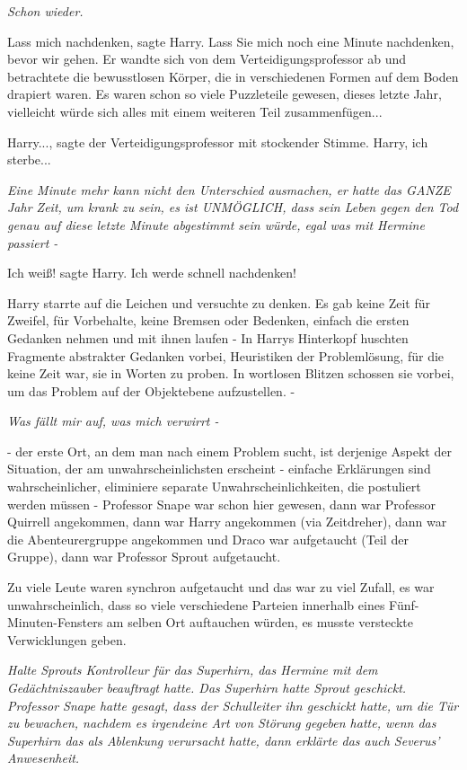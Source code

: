 \emph{Schon wieder.}

\glqq{}Lass mich nachdenken\grqq{}, sagte Harry. \glqq{}Lass Sie mich noch eine
Minute nachdenken, bevor wir gehen.\grqq{} Er wandte sich von dem
Verteidigungsprofessor ab und betrachtete die bewusstlosen Körper, die in
verschiedenen Formen auf dem Boden drapiert waren. Es waren schon so viele
Puzzleteile gewesen, dieses letzte Jahr, vielleicht würde sich alles mit einem
weiteren Teil zusammenfügen...

\glqq{}Harry...\grqq{}, sagte der Verteidigungsprofessor mit stockender Stimme.
\glqq{}Harry, ich sterbe...\grqq{}

\emph{Eine Minute mehr kann nicht den Unterschied ausmachen, er hatte das GANZE
Jahr Zeit, um krank zu sein, es ist UNMÖGLICH, dass sein Leben gegen den Tod
genau auf diese letzte Minute abgestimmt sein würde, egal was mit Hermine
passiert -}

\glqq{}Ich weiß!\grqq{} sagte Harry. \glqq{}Ich werde schnell nachdenken!\grqq{}

Harry starrte auf die Leichen und versuchte zu denken. Es gab keine Zeit für
Zweifel, für Vorbehalte, keine Bremsen oder Bedenken, einfach die ersten
Gedanken nehmen und mit ihnen laufen - In Harrys Hinterkopf huschten Fragmente
abstrakter Gedanken vorbei, Heuristiken der Problemlösung, für die keine Zeit
war, sie in Worten zu proben. In wortlosen Blitzen schossen sie vorbei, um das
Problem auf der Objektebene aufzustellen. -

\emph{Was fällt mir auf, was mich verwirrt -}

- der erste Ort, an dem man nach einem Problem sucht, ist derjenige Aspekt der
Situation, der am unwahrscheinlichsten erscheint - einfache Erklärungen sind
wahrscheinlicher, eliminiere separate Unwahrscheinlichkeiten, die postuliert
werden müssen - Professor Snape war schon hier gewesen, dann war Professor
Quirrell angekommen, dann war Harry angekommen (via Zeitdreher), dann war die
Abenteurergruppe angekommen und Draco war aufgetaucht (Teil der Gruppe), dann
war Professor Sprout aufgetaucht.

Zu viele Leute waren synchron aufgetaucht und das war zu viel Zufall, es war
unwahrscheinlich, dass so viele verschiedene Parteien innerhalb eines
Fünf-Minuten-Fensters am selben Ort auftauchen würden, es musste versteckte
Verwicklungen geben.

\emph{Halte Sprouts Kontrolleur für das Superhirn, das Hermine mit dem
Gedächtniszauber beauftragt hatte. Das Superhirn hatte Sprout geschickt.
Professor Snape hatte gesagt, dass der Schulleiter ihn geschickt hatte, um die
Tür zu bewachen, nachdem es irgendeine Art von Störung gegeben hatte, wenn das
Superhirn das als Ablenkung verursacht hatte, dann erklärte das auch Severus'
Anwesenheit.}

